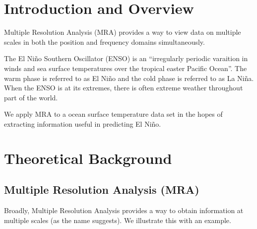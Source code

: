\documentclass[10pt]{article}
\begin{document}

\section{Introduction and Overview}
Multiple Resolution Analysis (MRA) provides a way to view data on multiple scales in both the position and frequency domains simultaneously.

The El Ni\~no Southern Oscillator (ENSO) is an ``irregularly periodic varaition in winds and sea surface temperatures over the tropical easter Pacific Ocean''. The warm phase is referred to as El Ni\~no and the cold phase is referred to as La Ni\~na. When the ENSO is at its extremes, there is often extreme weather throughout part of the world.

We apply MRA to a ocean surface temperature data set in the hopes of extracting information useful in predicting El Ni\~no.

\section{Theoretical Background}


\subsection{Multiple Resolution Analysis (MRA)}
Broadly, Multiple Resolution Analysis provides a way to obtain information at multiple scales (as the name suggests). We illustrate this with an example.
\end{document}
